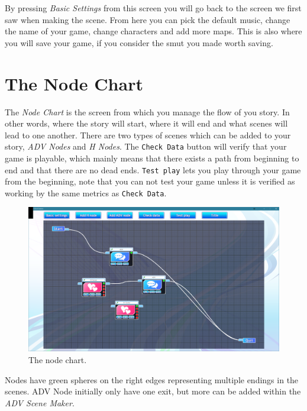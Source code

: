 \documentclass{report}
\begin{document}
By pressing \textit{Basic Settings} from this screen you will go back to the screen we first saw when making the scene. From here you can pick the default music, change the name of your game, change characters and add more maps. This is also where you will save your game, if you consider the smut you made worth saving.

\section{The Node Chart}

The \textit{Node Chart} is the screen from which you manage the flow of you story. In other words, where the story will start, where it will end and what scenes will lead to one another. There are two types of scenes which can be added to your story, \textit{ADV Nodes} and \textit{H Nodes}. The \texttt{Check Data} button will verify that your game is playable, which mainly means that there exists a path from beginning to end and that there are no dead ends. \texttt{Test play} lets you play through your game from the beginning, note that you can not test your game unless it is verified as working by the same metrics as \texttt{Check Data}.

\begin{figure}[!htpb]
    \centering
    \includegraphics[width=\textwidth]{Figures/noide_chart.PNG}
    \caption{The node chart.}
    \label{fig:node_chart}
\end{figure}

Nodes have green spheres on the right edges representing multiple endings in the scenes. ADV Node initially only have one exit, but more can be added within the \textit{ADV Scene Maker}.
\end{document}
